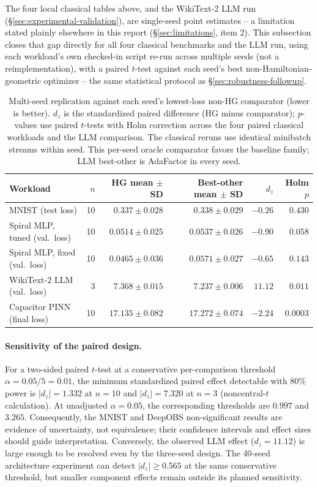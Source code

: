 \documentclass[10pt,twocolumn]{article}
\begin{document}
The four local classical tables above, and the WikiText-2 LLM run
(\S\ref{sec:experimental-validation}), are single-seed point estimates -- a
limitation stated plainly elsewhere in this report
(\S\ref{sec:limitations}, item 2). This subsection closes that gap directly
for all four classical benchmarks and the LLM run, using each
workload's own checked-in script re-run across multiple seeds (not a
reimplementation), with a paired $t$-test against each seed's best
non-Hamiltonian-geometric optimizer -- the same statistical protocol as
\S\ref{sec:robustness-followup}.

\begin{table}[t]
\centering\small
\begin{tabular}{@{}lrrrrr@{}}
\toprule
Workload & $n$ & HG mean $\pm$ SD & Best-other mean $\pm$ SD & $d_z$ & Holm $p$ \\
\midrule
MNIST (test loss) & 10 & $0.337\pm0.028$ & $0.338\pm0.029$ & $-0.26$ & $0.430$ \\
Spiral MLP, tuned (val.\ loss) & 10 & $0.0514\pm0.025$ & $0.0537\pm0.026$ & $-0.90$ & $0.058$ \\
Spiral MLP, fixed (val.\ loss) & 10 & $0.0465\pm0.036$ & $0.0571\pm0.027$ & $-0.65$ & $0.143$ \\
WikiText-2 LLM (val.\ loss) & 3 & $7.368\pm0.015$ & $7.237\pm0.006$ & $11.12$ & $\mathbf{0.011}$ \\
Capacitor PINN (final loss) & 10 & $17.135\pm0.082$ & $17.272\pm0.074$ & $-2.24$ & $\mathbf{0.0003}$ \\
\bottomrule
\end{tabular}
\caption{Multi-seed replication against each seed's lowest-loss non-HG
comparator (lower is better). $d_z$ is the standardized paired difference
(HG minus comparator); $p$-values use paired $t$-tests with Holm correction
across the four paired classical workloads and the LLM comparison. The
classical reruns use identical minibatch streams within seed. This per-seed
oracle comparator favors the baseline family; LLM best-other is AdaFactor in
every seed.}
\label{tab:classical-multiseed}
\end{table}

\paragraph{Sensitivity of the paired design.}
For a two-sided paired $t$-test at a conservative per-comparison threshold
$\alpha=0.05/5=0.01$, the minimum standardized paired effect detectable
with 80\% power is $|d_z|=1.332$ at $n=10$ and $|d_z|=7.320$ at $n=3$
(noncentral-$t$ calculation). At unadjusted $\alpha=0.05$, the corresponding
thresholds are $0.997$ and $3.265$. Consequently, the MNIST and DeepOBS
non-significant results are evidence of uncertainty, not equivalence; their
confidence intervals and effect sizes should guide interpretation. Conversely,
the observed LLM effect ($d_z=11.12$) is large enough to be resolved even by
the three-seed design. The 40-seed architecture experiment can detect
$|d_z|\ge0.565$ at the same conservative threshold, but smaller component
effects remain outside its planned sensitivity.
\end{document}
